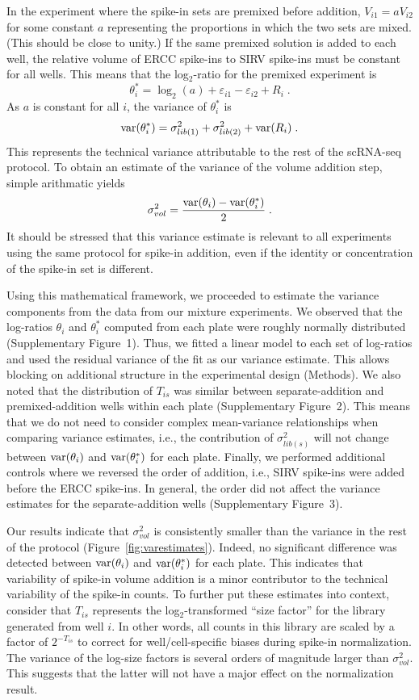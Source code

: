 \documentclass{article}
\newcommand{\suppfignorm}{1}
\newcommand{\suppfigtotals}{2}
\newcommand{\suppfigorder}{3}
\begin{document}
In the experiment where the spike-in sets are premixed before addition, $V_{i1}=aV_{i2}$ for some constant $a$ representing the proportions in which the two sets are mixed.
(This should be close to unity.)
If the same premixed solution is added to each well, the relative volume of ERCC spike-ins to SIRV spike-ins must be constant for all wells.
This means that the log$_2$-ratio for the premixed experiment is 
\[
\theta^*_i = \log_2(a) + \varepsilon_{i1} - \varepsilon_{i2} + R_i \;.
\]
As $a$ is constant for all $i$, the variance of $\theta^*_i$ is
\[
\mbox{var}(\theta^*_i) = \sigma^2_{lib(1)} + \sigma^2_{lib(2)} + \mbox{var}(R_i) \;.
\]
This represents the technical variance attributable to the rest of the scRNA-seq protocol.
To obtain an estimate of the variance of the volume addition step, simple arithmatic yields
\[
\sigma^2_{vol} = \frac{\mbox{var}(\theta_i) - \mbox{var}(\theta^*_i)}{2} \;.
\]
It should be stressed that this variance estimate is relevant to all experiments using the same protocol for spike-in addition, even if the identity or concentration of the spike-in set is different.

Using this mathematical framework, we proceeded to estimate the variance components from the data from our mixture experiments.
We observed that the log-ratios $\theta_i$ and $\theta^*_i$ computed from each plate were roughly normally distributed (Supplementary Figure~\suppfignorm{}).
Thus, we fitted a linear model to each set of log-ratios and used the residual variance of the fit as our variance estimate.
This allows blocking on additional structure in the experimental design (Methods).
We also noted that the distribution of $T_{is}$ was similar between separate-addition and premixed-addition wells within each plate (Supplementary Figure~\suppfigtotals{}).
This means that we do not need to consider complex mean-variance relationships when comparing variance estimates, i.e., the contribution of $\sigma^2_{lib(s)}$ will not change between $\mbox{var}(\theta_i)$ and $\mbox{var}(\theta^*_i)$ for each plate.
Finally, we performed additional controls where we reversed the order of addition, i.e., SIRV spike-ins were added before the ERCC spike-ins.
In general, the order did not affect the variance estimates for the separate-addition wells (Supplementary Figure~\suppfigorder{}).

Our results indicate that $\sigma^2_{vol}$ is consistently smaller than the variance in the rest of the protocol (Figure~\ref{fig:varestimates}).
Indeed, no significant difference was detected between $\mbox{var}(\theta_i)$ and $\mbox{var}(\theta^*_i)$ for each plate.
This indicates that variability of spike-in volume addition is a minor contributor to the technical variability of the spike-in counts.
To further put these estimates into context, consider that $T_{is}$ represents the log$_2$-transformed ``size factor'' for the library generated from well $i$.
In other words, all counts in this library are scaled by a factor of $2^{-T_{is}}$ to correct for well/cell-specific biases during spike-in normalization.
The variance of the log-size factors is several orders of magnitude larger than $\sigma^2_{vol}$.
This suggests that the latter will not have a major effect on the normalization result.
\end{document}
